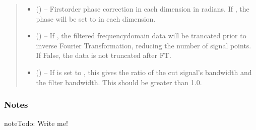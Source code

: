 \documentclass[letterpaper,10pt,english]{sphinxmanual}
\begin{document}
\begin{fulllineitems}
\begin{quote}
\begin{description}
\begin{itemize}
\item {} 
\sphinxAtStartPar
{} (\sphinxstyleliteralemphasis{\sphinxupquote{{[}}}\sphinxstyleliteralemphasis{\sphinxupquote{{]} or }}\sphinxstyleliteralemphasis{\sphinxupquote{{[}}}\sphinxstyleliteralemphasis{\sphinxupquote{, }}\sphinxstyleliteralemphasis{\sphinxupquote{{]}}}\sphinxstyleliteralemphasis{\sphinxupquote{, }}\sphinxstyleliteralemphasis{\sphinxupquote{ {[}}}\sphinxstyleliteralemphasis{\sphinxupquote{, }}\sphinxstyleliteralemphasis{\sphinxupquote{{]}}}) – First\sphinxhyphen{}order phase correction in each dimension in radians. If ,
the phase will be set to  in each dimension.

\item {} 
\sphinxAtStartPar
{} (\sphinxstyleliteralemphasis{\sphinxupquote{, }}) – If , the filtered frequency\sphinxhyphen{}domain data will be trancated
prior to inverse Fourier Transformation, reducing the number
of signal points. If False, the data is not truncated after FT.

\item {} 
\sphinxAtStartPar
{} (\sphinxstyleliteralemphasis{\sphinxupquote{, }}) – If  is set to , this gives the ratio of the cut signal’s
bandwidth and the filter bandwidth. This should be greater than 1.0.

\end{itemize}

\end{description}\end{quote}
\subsubsection*{Notes}

\begin{sphinxadmonition}{note}{\label{\detokenize{references/freqfilter:id1}}Todo:}
\sphinxAtStartPar
Write me!
\end{sphinxadmonition}


\end{fulllineitems}
\end{document}
